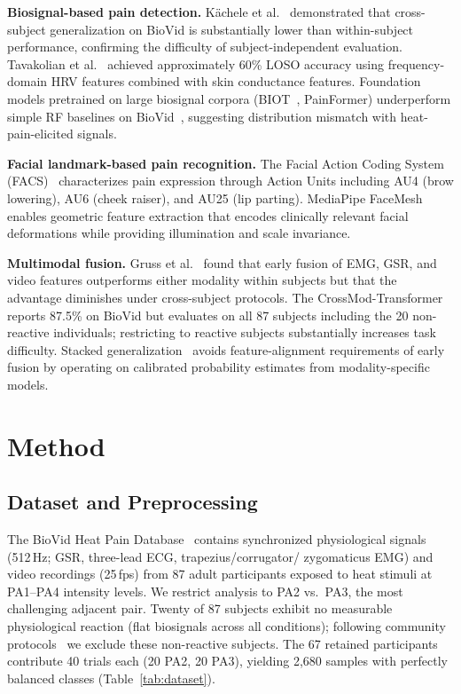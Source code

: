 \documentclass[sigconf]{acmart}
\begin{document}
\textbf{Biosignal-based pain detection.}
Kächele et al.~\cite{kachele2016} demonstrated that cross-subject
generalization on BioVid is substantially lower than within-subject
performance, confirming the difficulty of subject-independent evaluation.
Tavakolian et al.~\cite{tavakolian2020} achieved approximately 60\%
LOSO accuracy using frequency-domain HRV features combined with skin
conductance features. Foundation models pretrained on large biosignal
corpora (BIOT~\cite{yang2023}, PainFormer) underperform simple RF baselines
on BioVid~\cite{gkikas2023}, suggesting distribution mismatch with
heat-pain-elicited signals.

\textbf{Facial landmark-based pain recognition.}
The Facial Action Coding System (FACS)~\cite{ekman1978} characterizes pain
expression through Action Units including AU4 (brow lowering), AU6 (cheek
raiser), and AU25 (lip parting). MediaPipe FaceMesh~\cite{lugaresi2019}
enables geometric feature extraction that encodes clinically relevant facial
deformations while providing illumination and scale invariance.

\textbf{Multimodal fusion.}
Gruss et al.~\cite{gruss2015} found that early fusion of EMG, GSR, and video
features outperforms either modality within subjects but that the advantage
diminishes under cross-subject protocols. The CrossMod-Transformer~\cite{farmani2025}
reports 87.5\% on BioVid but evaluates on all 87 subjects including the
20 non-reactive individuals; restricting to reactive subjects substantially
increases task difficulty. Stacked generalization~\cite{wolpert1992,breiman1996}
avoids feature-alignment requirements of early fusion by operating on
calibrated probability estimates from modality-specific models.

\section{Method}
\label{sec:method}

\subsection{Dataset and Preprocessing}

The BioVid Heat Pain Database~\cite{walter2013} contains synchronized
physiological signals (512\,Hz; GSR, three-lead ECG, trapezius/corrugator/
zygomaticus EMG) and video recordings (25\,fps) from 87 adult participants
exposed to heat stimuli at PA1--PA4 intensity levels. We restrict analysis
to PA2 vs.\ PA3, the most challenging adjacent pair. Twenty of 87 subjects
exhibit no measurable physiological reaction (flat biosignals across all
conditions); following community protocols~\cite{gruss2015} we exclude these
non-reactive subjects. The 67 retained participants contribute 40 trials each
(20 PA2, 20 PA3), yielding 2,680 samples with perfectly balanced classes
(Table~\ref{tab:dataset}).
\end{document}
